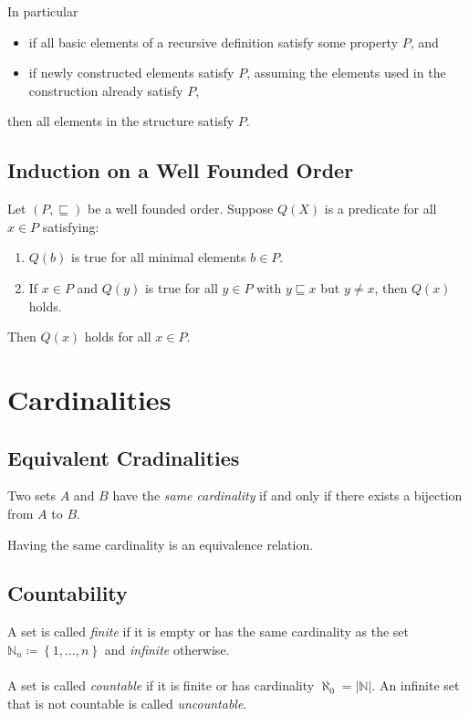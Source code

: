 \documentclass[fleqn]{article}
\begin{document}
In particular
\begin{itemize}
    \item if all basic elements of a recursive definition satisfy some property $P$, and
    \item if newly constructed elements satisfy $P$, assuming the elements used in
        the construction already satisfy $P$,
\end{itemize}
then all elements in the structure satisfy $P$.

\subsection{Induction on a Well Founded Order}
Let $(P, \sqsubseteq)$ be a well founded order. Suppose $Q(X)$ is a predicate
for all $x \in P$ satisfying:
\begin{enumerate}
    \item $Q(b)$ is true for all minimal elements $b \in P$.
    \item If $x \in P$ and $Q(y)$ is true for all $y \in P$ with $y \sqsubseteq x$
        but $y \neq x$, then $Q(x)$ holds.
\end{enumerate}
Then $Q(x)$ holds for all $x \in P$.

\section{Cardinalities}
\subsection{Equivalent Cradinalities}
Two sets $A$ and $B$ have the \textit{same cardinality} if and only if there
exists a bijection from $A$ to $B$.

Having the same cardinality is an equivalence relation.

\subsection{Countability}
A set is called \textit{finite} if it is empty or has the same cardinality as the set\\
$\mathbb{N}_n \coloneqq \left\{ 1,\dots, n \right\}$ and \textit{infinite} otherwise.\\
\\
A set is called \textit{countable} if it is finite or has cardinality $\aleph_0 = |\mathbb{N}|$.
An infinite set that is not countable is called \textit{uncountable}.
\end{document}
